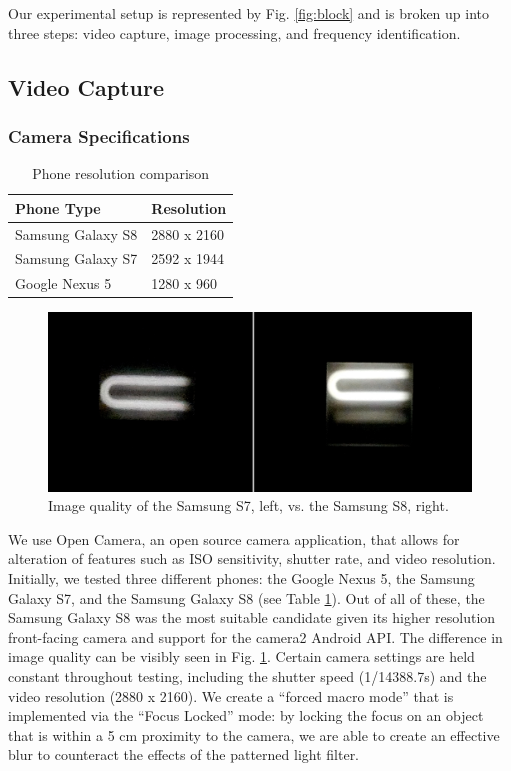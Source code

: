 \documentclass[conference]{IEEEtran}
\begin{document}
Our experimental setup is represented by Fig. \ref{fig:block} and is broken up into three steps: video capture, image processing, and frequency identification.

\subsection{Video Capture}
\subsubsection{Camera Specifications}

\begin{table}
	\caption{Phone resolution comparison}\label{table:resolution}
	\begin{center}
	\begin{tabular}{|l|l|}
	\hline
	Phone Type        & Resolution  \\ \hline
	Samsung Galaxy S8 & 2880 x 2160 \\ \hline
	Samsung Galaxy S7 & 2592 x 1944 \\ \hline
	Google Nexus 5    & 1280 x 960  \\ \hline
	\end{tabular}
	\end{center}
\end{table}

\begin{figure}
\centerline{\includegraphics[width=0.9\columnwidth]{figures/s7_vs_s8.jpg}}
	\caption{Image quality of the Samsung S7, left, vs. the Samsung S8, right.}
	\label{fig:s7_vs_s8}
\end{figure}

We use Open Camera, an open source camera application, that allows for alteration of features such as ISO sensitivity, shutter rate, and video resolution. Initially, we tested three different phones: the Google Nexus 5, the Samsung Galaxy S7, and the Samsung Galaxy S8 (see Table \ref{table:resolution}). Out of all of these, the Samsung Galaxy S8 was the most suitable candidate given its higher resolution front-facing camera and support for the camera2 Android API. The difference in image quality can be visibly seen in Fig. \ref{fig:s7_vs_s8}. Certain camera settings are held constant throughout testing, including the shutter speed (1/14388.7s) and the video resolution (2880 x 2160). We create a ``forced macro mode'' that is implemented via the ``Focus Locked'' mode: by locking the focus on an object that is within a 5 cm proximity to the camera, we are able to create an effective blur to counteract the effects of the patterned light filter.
\end{document}
